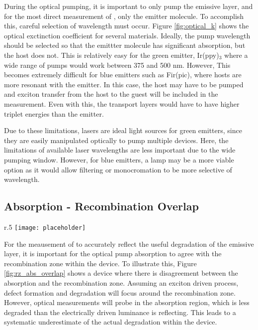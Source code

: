 \documentclass[../thesis.tex]{subfiles}
\begin{document}
During the optical pumping, it is important to only pump the emissive layer, and for the most direct measurement of \pl, only the emitter molecule.
To accomplish this, careful selection of wavelength must occur.  
Figure \ref{fig:optical_k} shows the optical exctinction coefficient for several materials.  
Ideally, the pump wavelength should be selected so that the emittter molecule has significant absorption, but the host does not.  
This is relatively easy for the green emitter, Ir(ppy)$_3$ where a wide range of pumps would work between 375 and 500 nm.
However, This becomes extremely difficult for blue emitters such as Fir(pic), where hosts are more resonant with the emitter.  
In this case, the host may have to be pumped and exciton transfer from the host to the guest will be included in the measurement.
Even with this, the transport layers would have to have higher triplet energies than the emitter.

Due to these limitations, lasers are ideal light sources for green emitters, since they are easily manipulated optically to pump multiple devices.
Here, the limitations of available laser wavelengths are less important due to the wide pumping window.
However, for blue emitters, a lamp may be a more viable option as it would allow filtering or monocromation to be more selective of wavelength.



\subsection{Absorption - Recombination Overlap}\label{sec:abs_rz_overlap}

\begin{wrapfigure}{r}{.5\textwidth}
\centering
\texttt{[image: placeholder]}
\caption{Exciton recombination zone and pump absorption for a hypothetical thick EML device are shown.}
\label{fig:rz_abs_overlap}
\end{wrapfigure}


For the meausement of \pl to accurately reflect the useful degradation of the emissive layer, it is important for the optical pump absorption to agree with the recombination zone within the device.  
To illustrate this, Figure \ref{fig:rz_abs_overlap} shows a device where there is disagreement between the absorption and the recombination zone.  
Assuming an exciton driven process, defect formation and degradation will focus around the recombination zone.
However, optical measurements will probe in the absorption region, which is less degraded than the electrically driven luminance is reflecting.
This leads to a systematic underestimate of the actual \pl degradation within the device.
\end{document}
